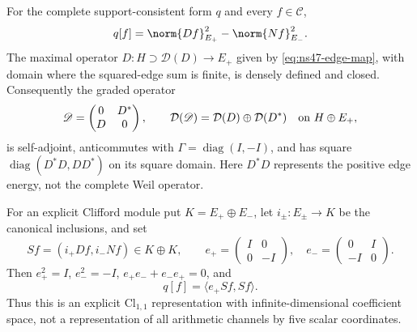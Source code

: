 \begin{proposition}
\label{prop:ns47-clifford-lift}
For the complete support-consistent form $q$ and every $f\in\mathcal C$,
\begin{equation}\label{eq:ns47-signed-lift}
 q[f]=\norm{Df}_{E_+}^2-\norm{Nf}_{E_-}^2.
\end{equation}
The maximal operator $D:H\supset\mathcal D(D)\to E_+$ given by
\eqref{eq:ns47-edge-map}, with domain where the squared-edge sum is
finite, is densely defined and closed. Consequently the graded operator
\begin{equation}\label{eq:ns47-dirac}
 \mathscr D=\begin{pmatrix}0&D^*\\D&0\end{pmatrix},\qquad
 \mathcal D(\mathscr D)=\mathcal D(D)\oplus\mathcal D(D^*)
 \quad\hbox{on }H\oplus E_+,
\end{equation}
is self-adjoint, anticommutes with $\Gamma=\operatorname{diag}(I,-I)$,
and has square $\operatorname{diag}(D^*D,DD^*)$ on its square domain.
Here $D^*D$ represents the positive edge energy, not the complete Weil
operator.

For an explicit Clifford module put $K=E_+\oplus E_-$, let
$i_\pm:E_\pm\to K$ be the canonical inclusions, and set
\[
 S f=(i_+Df,i_-Nf)\in K\oplus K,\qquad
 e_+=\begin{pmatrix}I&0\\0&-I\end{pmatrix},\quad
 e_-=\begin{pmatrix}0&I\\-I&0\end{pmatrix}.
\]
Then $e_+^2=I$, $e_-^2=-I$, $e_+e_-+e_-e_+=0$, and
\begin{equation}\label{eq:ns47-clifford}
 q[f]=\langle e_+Sf,Sf\rangle.
\end{equation}
Thus this is an explicit $\mathrm{Cl}_{1,1}$ representation with
infinite-dimensional coefficient space, not a representation of all
arithmetic channels by five scalar coordinates.
\end{proposition}
